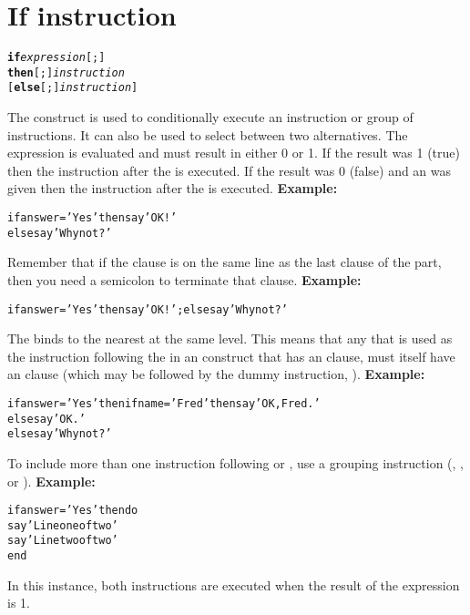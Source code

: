 \chapter{If instruction}
\index{,}
\begin{shaded}
\begin{alltt}
\textbf{if} \emph{expression}[;]
     \textbf{then}[;] \emph{instruction}
    [\textbf{else}[;] \emph{instruction}]
\end{alltt}
\end{shaded}
 The  construct is used to conditionally execute an
instruction or group of instructions.
It can also be used to select between two alternatives.
 The expression is evaluated and must result in either 0 or 1.
If the result was 1 (true) then the instruction after the
 is executed.
If the result was 0 (false) and an  was given
then the instruction after the  is executed.
 \textbf{Example:}
\begin{alltt}
if answer='Yes' then say 'OK!'
                else say 'Why not?'
\end{alltt}
 Remember that if the  clause is on the same line as the
last clause of the  part, then you need a semicolon to
terminate that clause.
 \textbf{Example:}
\begin{alltt}
if answer='Yes' then say 'OK!';  else say 'Why not?'
\end{alltt}
 The  binds to the nearest  at the same level.
This means that any  that is used as the instruction
following the  in an  construct that has an
 clause, must itself have an  clause (which
may be followed by the dummy instruction, ).
 \textbf{Example:}
\begin{alltt}
if answer='Yes' then if name='Fred' then say 'OK, Fred.'
                                    else say 'OK.'
                else say 'Why not?'
\end{alltt}
 
To include more than one instruction following  or
, use a grouping instruction (, ,
or ).
 \textbf{Example:}
\begin{alltt}
if answer='Yes' then do
  say 'Line one of two'
  say 'Line two of two'
  end
\end{alltt}
In this instance, both  instructions are executed when
the result of the  expression is 1.
 
